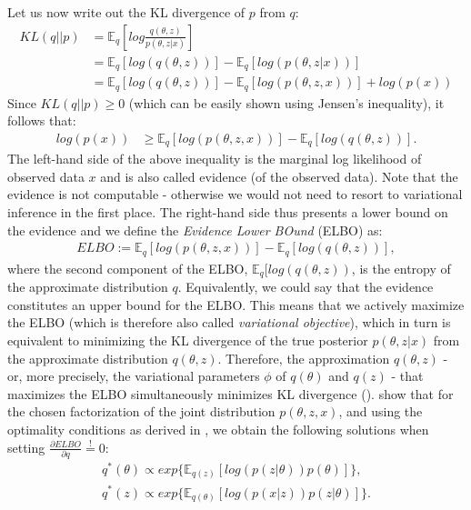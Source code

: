 Let us now write out the KL divergence of $p$ from $q$:
\begin{align*}
KL(q||p) &= \mathbb{E}_q[log\frac{q(\theta,z)}{p(\theta,z|x)}] \\
&= \mathbb{E}_q[log(q(\theta,z))] - \mathbb{E}_q[log(p(\theta,z|x))] \\
&=\mathbb{E}_q[log(q(\theta,z))] - \mathbb{E}_q[log(p(\theta,z,x))] + log(p(x)) 
\end{align*}
Since $KL(q||p) \geq 0$ (which can be easily shown using Jensen's inequality), it follows that:
\begin{align*}
log(p(x)) & \geq \mathbb{E}_q[log(p(\theta,z,x))] - \mathbb{E}_q[log(q(\theta,z))].
\end{align*}
The left-hand side of the above inequality is the marginal log likelihood of observed data $x$ and is also called evidence (of the observed data). Note that the evidence is not computable - otherwise we would not need to resort to variational inference in the first place. The right-hand side thus presents a lower bound on the evidence and we define the \textit{Evidence Lower BOund} (ELBO) as:
\begin{align*}
ELBO := \mathbb{E}_q[log(p(\theta,z,x))] - \mathbb{E}_q[log(q(\theta,z))],
\end{align*}
where the second component of the ELBO, $\mathbb{E}_q[log(q(\theta,z))$, is the entropy of the approximate distribution $q$. Equivalently, we could say that the evidence constitutes an upper bound for the ELBO. This means that we actively maximize the ELBO (which is therefore also called \textit{variational objective}), which in turn is equivalent to minimizing the KL divergence of the true posterior $p(\theta,z|x)$ from the approximate distribution $q(\theta,z)$. Therefore, the approximation $q(\theta,z)$ - or, more precisely, the variational parameters $\phi$ of $q(\theta)$ and $q(z)$ - that maximizes the ELBO simultaneously minimizes KL divergence (\citealp{blei2003latent, wang2013variational}). \cite{wang2013variational} show that for the chosen factorization of the joint distribution $p(\theta,z,x)$, and using the optimality conditions as derived in \cite{bishop2006pattern}, we obtain the following solutions when setting $\frac{\partial ELBO}{\partial q}\overset{!}{=}0$:
\begin{align*}
q^{*}(\theta) \propto exp\{\mathbb{E}_{q(z)}[log(p(z|\theta))p(\theta)]\}, \\
q^{*}(z) \propto exp\{\mathbb{E}_{q(\theta)}[log(p(x|z))p(z|\theta)]\}.
\end{align*}
